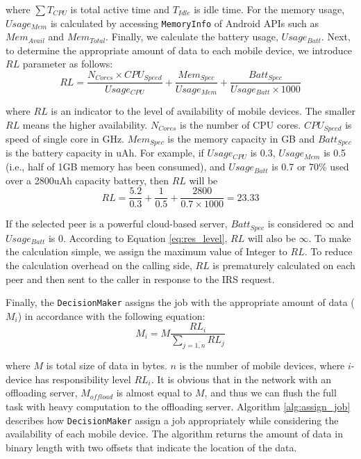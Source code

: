 \documentclass{sig-alternate}[10pt]
\begin{document}
\noindent where $\sum{T_{CPU}}$ is total active time and $T_{Idle}$ is idle time. For the memory usage, $Usage_{Mem}$ is calculated by accessing \texttt{MemoryInfo} of Android APIs such as $Mem_{Avail}$ and $Mem_{Total}$. Finally, we  calculate the battery usage, $Usage_{Batt}$. Next, to determine the appropriate amount of data to each mobile device, we introduce $RL$ parameter as follows:
\begin{equation}
\label{eq:res_level}
RL = \frac{N_{Cores} \times CPU_{Speed}}{Usage_{CPU}} + \frac{Mem_{Spec}}{Usage_{Mem}} + \frac{Batt_{Spec}}{Usage_{Batt} \times 1000}
\end{equation}

\noindent where $RL$ is an indicator to the level of availability of mobile devices. The smaller $RL$ means the higher availability. $N_{Cores}$ is the number of CPU cores. $CPU_{Speed}$ is speed of single core in GHz. $Mem_{Spec}$ is the memory capacity in GB and $Batt_{Spec}$ is the battery capacity in uAh. For example, if $Usage_{CPU}$ is 0.3, $Usage_{Mem}$ is 0.5 (i.e., half of 1GB memory has been consumed), and $Usage_{Batt}$ is 0.7 or 70\% used over a 2800uAh capacity battery, then $RL$ will be $$RL = \frac{5.2}{0.3} + \frac{1}{0.5} + \frac{2800}{0.7 \times 1000} = 23.33$$

If the selected peer is a powerful cloud-based server, $Batt_{Spec}$ is considered $\infty$ and $Usage_{Batt}$ is 0. According to Equation \ref{eq:res_level}, $RL$ will also be $\infty$. To make the calculation simple, we assign the maximum value of Integer to $RL$. To reduce the calculation overhead on the calling side, $RL$ is prematurely calculated on each peer and then sent to the caller in response to the IRS request.

Finally, the \texttt{DecisionMaker} assigns the job with the appropriate amount of data ($M_{i}$) in accordance with the following equation:
\begin{equation} 
\label{eq:data_amount}
M_{i} = M\frac{RL_{i}}{\sum_{j = \overline{1,n}}{RL_{j}}}
\end{equation}

\noindent where $M$ is total size of data in bytes. $n$ is the number of mobile devices, where $i$-device has responsibility level $RL_{i}$. It is obvious that in the network with an offloading server, $M_{offload}$ is almost equal to $M$, and thus we can flush the full task with heavy computation to the offloading server. Algorithm \ref{alg:assign_job} describes how \texttt{DecisionMaker} assign a job appropriately while considering the availability of each mobile device. The algorithm returns the amount of data in binary length with two offsets that indicate the location of the data.
\end{document}
